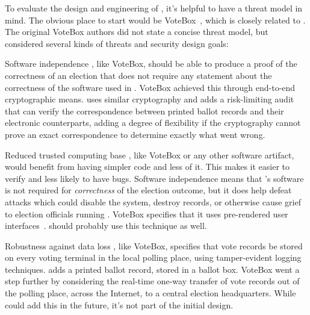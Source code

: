 \label{sec:threat}

To evaluate the design and engineering of \projname, it's helpful to
have a threat model in mind. The obvious place to start would be
VoteBox~\cite{sandler08votebox}, which is closely related to
\projname. The original VoteBox authors did not state a concise threat
model, but considered several kinds of threats and security design
goals:

\begin{compactdesc}
\item[Software independence]
    \projname, like VoteBox, should be able to produce a proof of the
    correctness of an election that does not require any statement
    about the correctness of the software used in \projname. VoteBox
    achieved this through end-to-end cryptographic means. \projname
    uses similar cryptography and adds a risk-limiting audit that can
    verify the correspondence between \projname printed ballot records
    and their electronic counterparts, adding a degree of flexibility
    if the cryptography cannot prove an exact correspondence to determine exactly what went wrong. 

\item[Reduced trusted computing base]
  \projname, like VoteBox or any other software artifact, would
  benefit from having simpler code and less of it. This makes it
  easier to verify and less likely to have bugs. Software independence
  means that \projname's software is not required for {\em
    correctness} of the election outcome, but it does help defeat
  attacks which could disable the system, destroy records, or
  otherwise cause grief to election officials running \projname.
  VoteBox specifies that it uses pre-rendered user interfaces~\cite{yee07pvote,yee07prui}.
  \projname should probably use this technique as well. 

\item[Robustness against data loss]
  \projname, like VoteBox, specifies that vote records be stored on
  every voting terminal in the local polling place, using
  tamper-evident logging techniques. \projname adds a printed
  ballot record, stored in a ballot box. VoteBox went a step further
  by considering the real-time one-way transfer of vote records out of
  the polling place, across the Internet, to a central election
  headquarters. While \projname could add this in the future, it's not part of the
  initial design.


\end{compactdesc}
